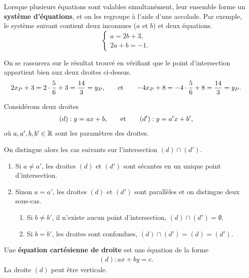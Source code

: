 \documentclass[a4paper, 12pt]{report}
\begin{document}
\begin{nota}
	Lorsque plusieurs équations sont valables simultanément, leur ensemble forme un \textbf{système d'équations}, et on les regroupe à l'aide d'une accolade.
	Par exemple, le système suivant contient deux inconnues ($a$ et $b$) et deux équations.
		\[ \begin{cases*} a = 2b + 3, \\ 2a + b = -1. \end{cases*} \]
\end{nota}


\begin{rmq}
	On se rassurera sur le résultat trouvé en vérifiant que le point d'intersection appartient bien aux deux droites ci-dessus.
		\begin{align*}
			2x_P + 3 = 2 \cdot \dfrac56 + 3 = \dfrac{14}3 = y_P, && \quad \text{et} \quad &&
			-4x_P + 8 = -4\cdot\dfrac56 + 8 = \dfrac{14}3 = y_P.
		\end{align*}
\end{rmq}


\begin{thm}
\label{thm:parallélisme-intersection}
	Considérons deux droites 
		\begin{align*}
			(d) : y = ax+b, && \quad \text{et} \quad &&
			(d') : y = a'x+b',
		\end{align*}
	où $a, a', b, b' \in \mathbb{R}$ sont les paramètres des droites.
	
	On distingue alors les cas suivants sur l'intersection $(d) \cap (d')$.
		\begin{enumerate}
			\item Si $a \neq a'$, les droites $(d)$ et $(d')$ sont sécantes en un unique point d'intersection.
			\item Sinon $a = a'$, les droites $(d)$ et $(d')$ sont parallèles et on distingue deux sous-cas.
				\begin{enumerate}[label=\roman*)]
					\item Si $b\neq b'$, il n'existe aucun point d'intersection, $(d) \cap (d') = \emptyset$.
					\item Si $b=b'$, les droites sont confondues, $(d) \cap (d') = (d) = (d')$.
				\end{enumerate}
		\end{enumerate}
\end{thm}

\begin{defn}
\label{dfn:equation-cartesienne}
	Une \textbf{équation cartésienne de droite} est une équation de la forme
		\begin{align}
			(d) : ax + by = c. \label{eq:cart}
		\end{align}
	La droite $(d)$ peut être verticale.
\end{defn}
\end{document}
